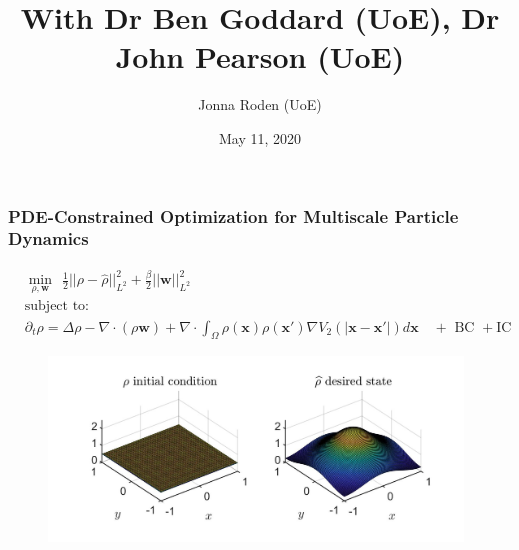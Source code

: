 \documentclass[aspectratio=169,xcolor=dvipsnames]{beamer}
\begin{document}
 \author[Jonna Roden (UoE)]{Jonna Roden (UoE)}
 \title[Supervision: Ben Goddard, John Pearson]{With Dr Ben Goddard (UoE), Dr John Pearson (UoE)}
 \date{May 11, 2020}
 
\begin{frame}
	\frametitle{PDE-Constrained Optimization for Multiscale Particle Dynamics}
	 \begin{align*}
	 &\min_{\rho,\mathbf{w}} \ \  \frac{1}{2}||\rho - \widehat \rho||_{L^2}^2 + \frac{\beta}{2}||\mathbf{w}||_{L^2}^2\\
	 &\text{subject to:}\\
	 &\partial_t \rho = \Delta \rho - \nabla \cdot (\rho\mathbf{w} ) + \nabla \cdot \int_\Omega \rho(\mathbf{x}) \rho(\mathbf{x'})\nabla V_2(|\mathbf{x}-\mathbf{x'}|)d\mathbf{x} \quad + \text{ BC } + \text{IC}
	 \end{align*}
	 \vspace{-0.5cm}
	 \begin{figure}
	 	\includegraphics[width=11cm]{Example2.jpg}
	 \end{figure}
\end{frame}
\end{document}
